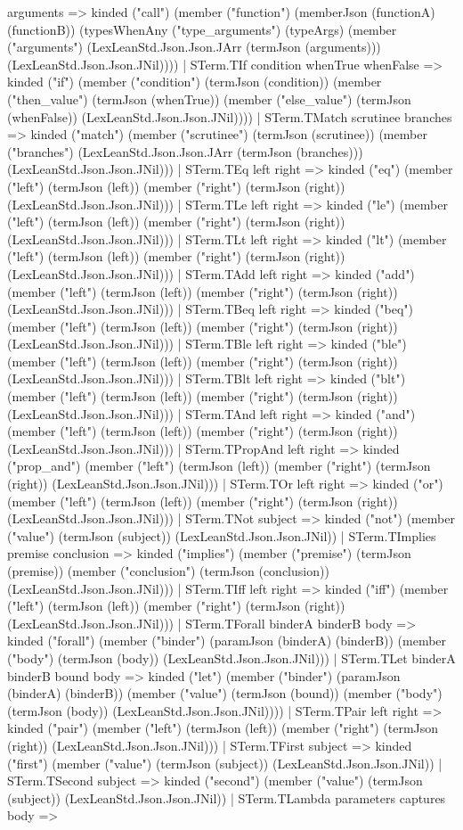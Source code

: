 \documentclass[11pt]{article}
\begin{document}
arguments => kinded ("call") (member ("function") (memberJson (functionA) (functionB)) (typesWhenAny ("type\_arguments") (typeArgs) (member ("arguments") (LexLeanStd.Json.Json.JArr (termJson (arguments))) (LexLeanStd.Json.Json.JNil)))) | STerm.TIf condition whenTrue whenFalse => kinded ("if") (member ("condition") (termJson (condition)) (member ("then\_value") (termJson (whenTrue)) (member ("else\_value") (termJson (whenFalse)) (LexLeanStd.Json.Json.JNil)))) | STerm.TMatch scrutinee branches => kinded ("match") (member ("scrutinee") (termJson (scrutinee)) (member ("branches") (LexLeanStd.Json.Json.JArr (termJson (branches))) (LexLeanStd.Json.Json.JNil))) | STerm.TEq left right => kinded ("eq") (member ("left") (termJson (left)) (member ("right") (termJson (right)) (LexLeanStd.Json.Json.JNil))) | STerm.TLe left right => kinded ("le") (member ("left") (termJson (left)) (member ("right") (termJson (right)) (LexLeanStd.Json.Json.JNil))) | STerm.TLt left right => kinded ("lt") (member ("left") (termJson (left)) (member ("right") (termJson (right)) (LexLeanStd.Json.Json.JNil))) | STerm.TAdd left right => kinded ("add") (member ("left") (termJson (left)) (member ("right") (termJson (right)) (LexLeanStd.Json.Json.JNil))) | STerm.TBeq left right => kinded ("beq") (member ("left") (termJson (left)) (member ("right") (termJson (right)) (LexLeanStd.Json.Json.JNil))) | STerm.TBle left right => kinded ("ble") (member ("left") (termJson (left)) (member ("right") (termJson (right)) (LexLeanStd.Json.Json.JNil))) | STerm.TBlt left right => kinded ("blt") (member ("left") (termJson (left)) (member ("right") (termJson (right)) (LexLeanStd.Json.Json.JNil))) | STerm.TAnd left right => kinded ("and") (member ("left") (termJson (left)) (member ("right") (termJson (right)) (LexLeanStd.Json.Json.JNil))) | STerm.TPropAnd left right => kinded ("prop\_and") (member ("left") (termJson (left)) (member ("right") (termJson (right)) (LexLeanStd.Json.Json.JNil))) | STerm.TOr left right => kinded ("or") (member ("left") (termJson (left)) (member ("right") (termJson (right)) (LexLeanStd.Json.Json.JNil))) | STerm.TNot subject => kinded ("not") (member ("value") (termJson (subject)) (LexLeanStd.Json.Json.JNil)) | STerm.TImplies premise conclusion => kinded ("implies") (member ("premise") (termJson (premise)) (member ("conclusion") (termJson (conclusion)) (LexLeanStd.Json.Json.JNil))) | STerm.TIff left right => kinded ("iff") (member ("left") (termJson (left)) (member ("right") (termJson (right)) (LexLeanStd.Json.Json.JNil))) | STerm.TForall binderA binderB body => kinded ("forall") (member ("binder") (paramJson (binderA) (binderB)) (member ("body") (termJson (body)) (LexLeanStd.Json.Json.JNil))) | STerm.TLet binderA binderB bound body => kinded ("let") (member ("binder") (paramJson (binderA) (binderB)) (member ("value") (termJson (bound)) (member ("body") (termJson (body)) (LexLeanStd.Json.Json.JNil)))) | STerm.TPair left right => kinded ("pair") (member ("left") (termJson (left)) (member ("right") (termJson (right)) (LexLeanStd.Json.Json.JNil))) | STerm.TFirst subject => kinded ("first") (member ("value") (termJson (subject)) (LexLeanStd.Json.Json.JNil)) | STerm.TSecond subject => kinded ("second") (member ("value") (termJson (subject)) (LexLeanStd.Json.Json.JNil)) | STerm.TLambda parameters captures body => 
\end{document}
